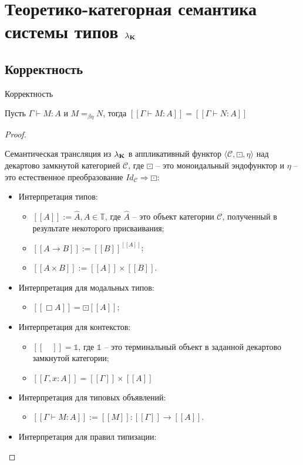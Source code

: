 \section{Теоретико-категорная семантика системы типов $\lambda_{\bf K}$}

\subsection{Корректность}

\begin{theorem} Корректность

  Пусть $\Gamma \vdash M : A$ и $M =_{\beta\eta} N$, тогда $[\![\Gamma \vdash M : A]\!] = [\![\Gamma \vdash N : A]\!]$
\end{theorem}

\begin{proof}

\begin{defin} Семантическая трансляция из $\lambda_{{\bf K}}$ в аппликативный функтор $\langle \mathcal{C}, \boxdot, \eta \rangle$ над декартово замкнутой категорией $\mathcal{C}$,
где $\boxdot$ -- это моноидальный эндофунктор и $\eta$ -- это естественное преобразование $Id_{\mathcal{C}} \Rightarrow \boxdot$:

\begin{itemize}
\item Интерпретация типов:
  \begin{itemize}
    \item $[\![A]\!] := \hat{A}, A \in \mathbb{T}$, где $\hat{A}$ -- это объект категории $\mathcal{C}$, полученный в результате некоторого присваивания;
    \item $[\![A \to B]\!] := [\![B]\!]^{[\![A]\!]}$;
    \item $[\![A \times B]\!] := [\![A]\!] \times [\![B]\!]$.
  \end{itemize}
\item Интерпретация для модальных типов:
  \begin{itemize}
    \item $[\![\Box A]\!] = \boxdot[\![A]\!]$;
  \end{itemize}
\item Интерпретация для контекстов:
  \begin{itemize}
    \item $[\![ \quad ]\!] = \mathds{1}$, где $\mathds{1}$ -- это терминальный объект в заданной декартово замкнутой категории;
    \item $[\![\Gamma, x : A]\!] = [\![\Gamma]\!] \times [\![A]\!]$
  \end{itemize}
\item Интерпретация для типовых объявлений:
  \begin{itemize}
    \item $[\![\Gamma \vdash M : A]\!] := [\![M]\!] : [\![\Gamma]\!] \to [\![A]\!]$.
  \end{itemize}
\item Интерпретация для правил типизации:


\end{itemize}
\end{defin}
\end{proof}
